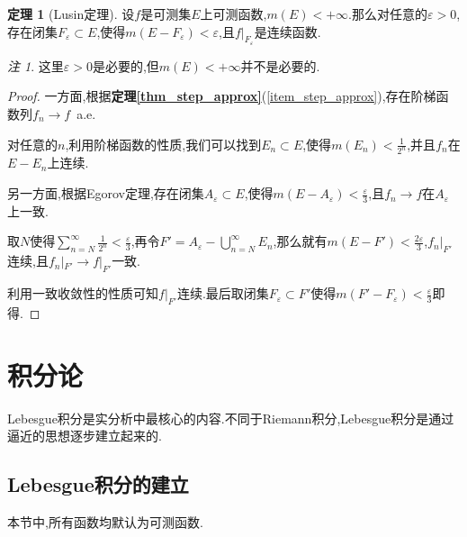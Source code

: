 \documentclass{ctexart}
\theoremstyle{definition}
\newtheorem{theorem}{定理}
\theoremstyle{remark}
\newtheorem*{remark}{注}
\begin{document}
	\begin{theorem}[Lusin定理]
		设$f$是可测集$E$上可测函数,$m(E)<+\infty$.那么对任意的$\varepsilon>0$,存在闭集$F_\varepsilon\subset E$,使得$m(E-F_\varepsilon)<\varepsilon$,且$f|_{F_\varepsilon}$是连续函数.
	\end{theorem}
	\begin{remark}
		这里$\varepsilon>0$是必要的,但$m(E)<+\infty$并不是必要的.
	\end{remark}
	\begin{proof}
		一方面,根据\textbf{定理\ref{thm_step_approx}}(\ref{item_step_approx}),存在阶梯函数列$f_n\to f$\ a.e.
		
		对任意的$n$,利用阶梯函数的性质,我们可以找到$E_n\subset E$,使得$m(E_n)<\frac{1}{2^n}$,并且$f_n$在$E-E_n$上连续.
		
		另一方面,根据Egorov定理,存在闭集$A_\varepsilon\subset E$,使得$m(E-A_\varepsilon)<\frac{\varepsilon}{3}$,且$f_n\to f$在$A_\varepsilon$上一致.
		
		取$N$使得$\sum_{n=N}^\infty{\frac{1}{2^n}}<\frac{\varepsilon}{3}$,再令$F'=A_\varepsilon-\bigcup_{n=N}^\infty{E_n}$,那么就有$m(E-F')<\frac{2\varepsilon}{3}$,$f_n|_{F'}$连续,且$f_n|_{F'}\to f|_{F'}$一致.
		
		利用一致收敛性的性质可知$f|_{F'}$连续.最后取闭集$F_\varepsilon\subset F'$使得$m(F'-F_\varepsilon)<\frac{\varepsilon}{3}$即得.
	\end{proof}
	
	\section{积分论}
	Lebesgue积分是实分析中最核心的内容.不同于Riemann积分,Lebesgue积分是通过逼近的思想逐步建立起来的.
	
	\subsection{Lebesgue积分的建立}
	本节中,所有函数均默认为可测函数.
	
\end{document}
